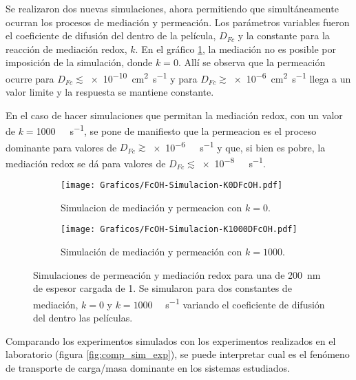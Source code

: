 		Se realizaron dos nuevas simulaciones, ahora permitiendo que simultáneamente ocurran los procesos de mediación y permeación. Los parámetros variables fueron el coeficiente de difusión del \fc\space dentro de la película, $D_{Fc}$ y la constante para la reacción de mediación redox, $k$. En el gráfico \ref{fig:sim_med_k0}, la mediación no es posible por imposición de la simulación, donde $k=0$. Allí se observa que la permeación ocurre para $D_{Fc}\lesssim$\SI{e-10}{\square\cm\per\second} y para $D_{Fc}\gtrsim$\SI{e-6}{\square\cm\per\second} llega a un valor limite y la respuesta se mantiene constante.

		En el caso de hacer simulaciones que permitan la mediación redox, con un valor de $k=$\SI{1000}{\per\Molar\per\second}, se pone de manifiesto que la permeacion es el proceso dominante para valores de $D_{Fc}\gtrsim$\SI{e-6}{\per\Molar\per\second} y que, si bien es pobre, la mediación redox se dá para valores de $D_{Fc}\lesssim$\SI{e-8}{\per\Molar\per\second}.

			\begin{figure}[ht]
				\begin{subfigure}[t]{0.495\textwidth}
					\centering
			 	    \texttt{[image: Graficos/FcOH-Simulacion-K0DFcOH.pdf]}
			        \caption{Simulacion de mediación y permeacion con $k=0$.}
			        \label{fig:sim_med_k0}
			      	\end{subfigure}
				\begin{subfigure}[t]{0.495\textwidth}
					\centering
			 	    \texttt{[image: Graficos/FcOH-Simulacion-K1000DFcOH.pdf]}
			        \caption{Simulación de mediación y permeación con $k=1000$.}
			        \label{fig:sim_med_1000}
			      	\end{subfigure}
			      	\caption[Simulación EQ de mediación/permeación]{Simulaciones de permeación y mediación redox para una \pdm\space de \SI{200}{nm} de espesor cargada de \ru\space \SI{1}{\Molar}. Se simularon para dos constantes de mediación, $k=0$ y $k=1000$ \si{\per\Molar\per\second} variando el coeficiente de difusión del \fc\space dentro las películas.}
			      	\label{fig:sim_med_perm}
			      	\end{figure}
			      	
		Comparando los experimentos simulados con los experimentos realizados en el laboratorio (figura \ref{fig:comp_sim_exp}), se puede interpretar cual es el fenómeno de transporte de carga/masa dominante en los sistemas estudiados. 

